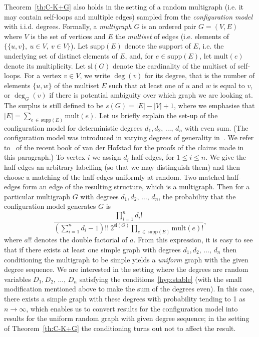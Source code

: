 \documentclass[10pt]{amsart}
\theoremstyle{definition}\newtheorem{defi}[theo]{Definition}\newtheorem{rema}[theo]{Remark}\newtheorem{exam}[theo]{Example}\newtheorem{exem}[theo]{Example}\newtheorem{nota}[theo]{Notation}
\newcommand{\supp}{\mathrm{supp}}
\newcommand{\sll}{\mathrm{sl}}
\newcommand{\mult}{\mathrm{mult}}
\begin{document}
Theorem~\ref{th:C-K+G} also holds in the setting of a random multigraph (i.e. it may contain self-loops and multiple edges) sampled from the \emph{configuration model} with i.i.d. degrees. Formally, a \emph{multigraph} $G$ is an ordered pair $G = (V,E)$ where $V$ is the set of vertices and $E$ the \emph{multiset} of edges (i.e. elements of $\{\{u,v\},\ u\in V,\ v\in V\}$). Let $\supp(E)$ denote the support of $E$, i.e. the underlying set of distinct elements of $E$, and, for $e \in \supp(E)$, let $\mult(e)$ denote its multiplicity. Let $\sll(G)$ denote the cardinality of the multiset of self-loops. For a vertex $v \in V$, we write $\deg(v)$ for its degree, that is the number of elements $\{u,w\}$ of the multiset $E$ such that at least one of $u$ and $w$ is equal to $v$, or $\deg_G(v)$ if there is potential ambiguity over which graph we are looking at. The surplus is still defined to be $s(G)=|E|-|V|+1$, where we emphasise that $|E| = \sum_{e\,\in\, \supp(E)} \mult(e)$. Let us briefly explain the set-up of the configuration model for deterministic degrees $d_1, d_2,\,\ldots,\,d_n$ with even sum. (The configuration model was introduced in varying degrees of generality in~\cite{BenderCanfield, Bollobas, Wormald}. We refer to~\cite[Chapter~7]{RvdH} of the recent book of van der Hofstad for the proofs of the claims made in this paragraph.) To vertex $i$ we assign $d_i$ half-edges, for $1 \le i \le n$. We give the half-edges an arbitrary labelling (so that we may distinguish them) and then choose a matching of the half-edges uniformly at random. Two matched half-edges form an edge of the resulting structure, which is a multigraph. Then for a particular multigraph $G$ with degrees $d_1, d_2,\,\ldots,\,d_n$, the probability that the configuration model generates $G$ is
\begin{equation}\label{eqn:config}
\frac{\prod\limits_{i=1}^n d_i!}{\left(\sum\limits_{i=1}^n d_i - 1\right)!! \ 2^{\sll(G)} \prod\limits_{e\,\in \,\supp(E)} \mult(e)!},
\end{equation}
where $a!!$ denotes the double factorial of $a$. From this expression, it is easy to see that if there exists at least one simple graph with degrees $d_1, d_2,\,\ldots,\,d_n$ then conditioning the multigraph to be simple yields a \emph{uniform} graph with the given degree sequence. We are interested in the setting where the degrees are random variables $D_1, D_2,\,\ldots,\,D_n$ satisfying the conditions~\eqref{hyp:stable} (with the small modification mentioned above to make the sum of the degrees even). In this case, there exists a simple graph with these degrees with probability tending to 1 as $n \to \infty$, which enables us to convert results for the configuration model into results for the uniform random graph with given degree sequence; in the setting of Theorem~\ref{th:C-K+G} the conditioning turns out not to affect the result.
\end{document}
